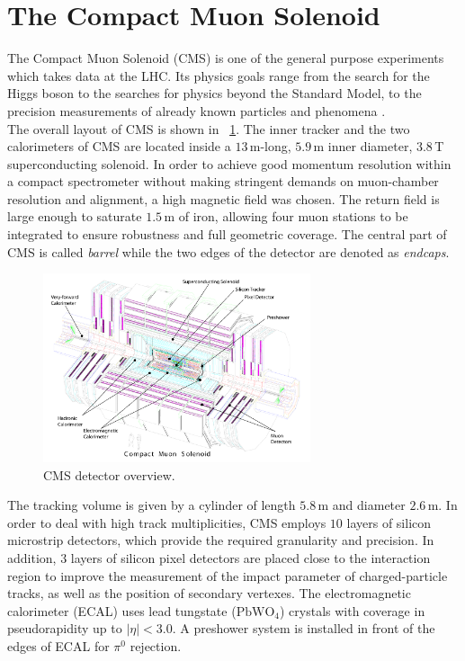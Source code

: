 \section{The Compact Muon Solenoid}\label{sec:cms}
The Compact Muon Solenoid (CMS) is one of the general purpose experiments which takes data at the LHC. Its physics goals range from the search for the Higgs boson to the searches for physics beyond the Standard Model, to the precision measurements of already known particles and phenomena \cite{CMS_Detector}. \\
The overall layout of CMS is shown in \figurename~\ref{CMS_Layout}. The inner tracker and the two calorimeters of CMS are located inside a $13\,$m-long, $5.9 \,$m inner diameter, $3.8\, $T superconducting solenoid. In order to achieve good momentum resolution within a compact spectrometer  without making stringent demands on muon-chamber resolution and alignment, a high magnetic field was chosen. The return field is large enough to saturate $1.5 \,$m of iron, allowing four muon stations to be integrated to ensure robustness and full geometric coverage. The central part of CMS is called \emph{barrel} while the two edges of the detector are denoted as \emph{endcaps}.
\begin{figure}[htbp]
\centering
\includegraphics[width=0.7\textwidth]{Images/CMS_Layout.pdf}
\caption{CMS detector overview.}
\label{CMS_Layout}
\end{figure}
The tracking volume is given by a cylinder of length $5.8 \,$m and diameter $2.6 \,$m. In order to deal with high track multiplicities, CMS employs $10$ layers of silicon microstrip detectors, which provide the required granularity and precision. In addition, $3$ layers of silicon pixel detectors are placed close to the interaction region to improve the measurement of the impact parameter of charged-particle tracks, as well as the position of secondary vertexes. The electromagnetic calorimeter (ECAL) uses lead tungstate ($\mathrm{PbWO_4}$) crystals with coverage in pseudorapidity up to $|\eta| < 3.0$.  A preshower system is installed in front of the edges of ECAL for $\pi^0$ rejection.

